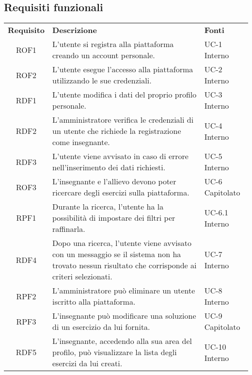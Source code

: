 \subsection{Requisiti funzionali}
\begin{tabularx}{\textwidth}{| c | p{10cm} | X |}
		\rowcolor{LightBlue}
		\color{white}\bfseries Requisito & \color{white}\bfseries Descrizione & \color{white}\bfseries Fonti\\[0.25cm]
		ROF1 & L'utente si registra alla piattaforma creando un account personale. & UC-1 \newline Interno\\
		ROF2 & L'utente esegue l'accesso alla piattaforma utilizzando le sue credenziali. & UC-2 \newline Interno\\
		RDF1 & L'utente modifica i dati del proprio profilo personale. & UC-3 \newline Interno\\
		RDF2 & L'amministratore verifica le credenziali di un utente che richiede la registrazione come insegnante. & UC-4 \newline Interno\\
		RDF3 & L'utente viene avvisato in caso di errore nell'inserimento dei dati richiesti. & UC-5 \newline Interno\\
		ROF3 & L'insegnante e l'allievo devono poter ricercare degli esercizi sulla piattaforma. & UC-6 \newline Capitolato\\
		RPF1 & Durante la ricerca, l'utente ha la possibilità di impostare dei filtri per raffinarla. & UC-6.1 \newline Interno\\
		RDF4 & Dopo una ricerca, l'utente viene avvisato con un messaggio se il sistema non ha trovato nessun risultato che corrisponde ai criteri selezionati. & UC-7 \newline Interno\\
		RPF2 & L'amministratore può eliminare un utente iscritto alla piattaforma. & UC-8 \newline Interno\\
		RPF3 & L'insegnante può modificare una soluzione di un esercizio da lui fornita. & UC-9 \newline Capitolato\\
		RDF5 & L'insegnante, accedendo alla sua area del profilo, può visualizzare la lista degli esercizi da lui creati. & UC-10 \newline Interno\\

\end{tabularx}
